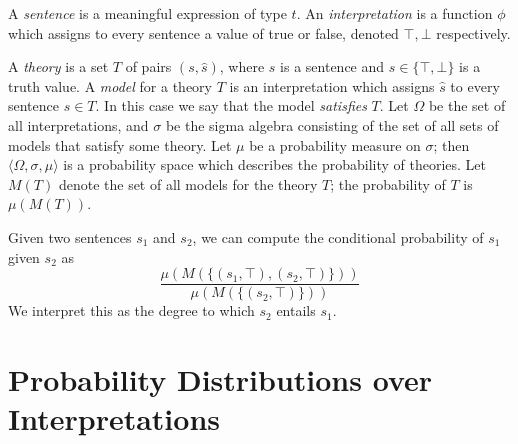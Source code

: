\documentclass[letterpaper]{article}
\begin{document}
A \emph{sentence} is a meaningful expression of type $t$. An
\emph{interpretation} is a function $\phi$ which assigns to every
sentence a value of true or false, denoted $\top, \bot$ respectively.

A \emph{theory} is a set $T$ of pairs $(s,\hat{s})$, where $s$ is a
sentence and $\hat{s}\in\{\top,\bot\}$ is a truth value. A
\emph{model} for a theory $T$ is an interpretation which assigns
$\hat{s}$ to every sentence $s\in T$. In this case we say that the model \emph{satisfies} $T$. Let $\Omega$ be the set of all
interpretations, and $\sigma$ be the sigma algebra consisting of the
set of all sets of models that satisfy some theory. Let $\mu$ be a probability measure
on $\sigma$; then $\langle\Omega,\sigma,\mu\rangle$ is a probability
space which describes the probability of theories. Let $M(T)$ denote
the set of all models for the theory $T$; the probability of $T$ is
$\mu(M(T))$.

Given two sentences $s_1$ and $s_2$, we can compute the conditional
probability of $s_1$ given $s_2$ as
$$\frac{\mu(M(\{(s_1, \top), (s_2, \top)\}))}{\mu(M(\{(s_2,\top)\}))}$$
We interpret this as the degree to which $s_2$ entails $s_1$.



\section{Probability Distributions over Interpretations}
\end{document}
